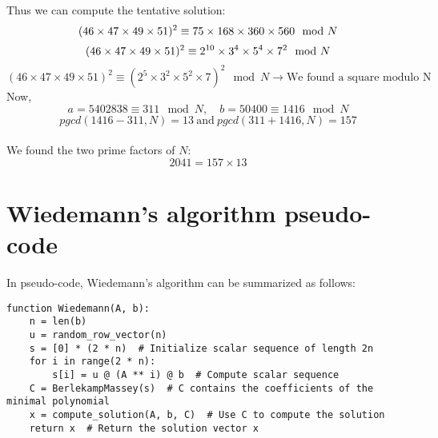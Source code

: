 \documentclass[a4paper, 11pt]{article}
\begin{document}
Thus we can compute the tentative solution:
\begin{equation}
    (46 \times 47 \times 49 \times 51)^2 \equiv 75 \times 168 \times 360 \times 560 \mod{N} \\
\end{equation}
\begin{equation}
    (46 \times 47 \times 49 \times 51)^2  \equiv 2^{10} \times 3^{4} \times 5^4 \times 7^2 \mod{N} \\
\end{equation}
\begin{equation}
    (46 \times 47 \times 49 \times 51)^2  \equiv (2^5 \times 3^2 \times 5^2 \times 7)^2 \mod{N} \rightarrow \text{We found a square modulo N}
\end{equation}
Now,
\begin{equation}
    a = 5402838 \equiv 311 \mod N, \quad b = 50400 \equiv 1416 \mod N
\end{equation}
\begin{equation}
    pgcd(1416 - 311, N) = 13 \ \text{and} \ pgcd(311 + 1416, N) = 157
\end{equation}
\\
We found the two prime factors of $N$:
\begin{equation}
    2041 = 157 \times 13
\end{equation}

\newpage

\appendix

\section{Wiedemann's algorithm pseudo-code}
In pseudo-code, Wiedemann's algorithm can be summarized as follows:
\begin{verbatim}
function Wiedemann(A, b):
    n = len(b)
    u = random_row_vector(n)
    s = [0] * (2 * n)  # Initialize scalar sequence of length 2n
    for i in range(2 * n):
        s[i] = u @ (A ** i) @ b  # Compute scalar sequence
    C = BerlekampMassey(s)  # C contains the coefficients of the minimal polynomial
    x = compute_solution(A, b, C)  # Use C to compute the solution
    return x  # Return the solution vector x
\end{verbatim}
\end{document}
